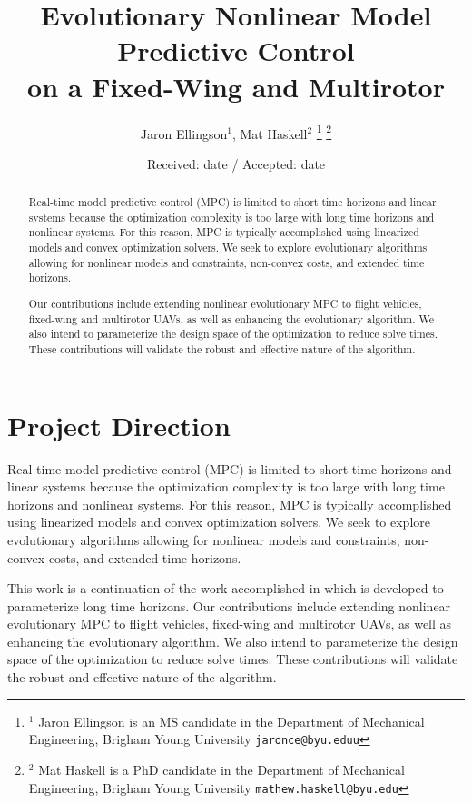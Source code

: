\documentclass[letterpaper, 10 pt, conference]{ieeeconf}  %
\title{\LARGE \bf
	Evolutionary Nonlinear Model Predictive Control \\ on a Fixed-Wing and Multirotor
}
\author{Jaron Ellingson$^{1}$, Mat Haskell$^{2}$%
	\thanks{$^{1}$ Jaron Ellingson is an MS candidate in the Department of Mechanical Engineering, Brigham Young University
		{\tt\small jaronce@byu.eduu}}%
	\thanks{$^{2}$ Mat Haskell is a PhD candidate in the Department of Mechanical Engineering, Brigham Young University
		{\tt\small mathew.haskell@byu.edu}}%
}
\begin{document}
\maketitle
\thispagestyle{empty}
\pagestyle{empty}

\date{Received: date / Accepted: date}


\maketitle

\begin{abstract}
Real-time model predictive control (MPC) is limited to short time horizons and linear systems because the optimization complexity is too large with long time horizons and nonlinear systems. For this reason, MPC is typically accomplished using linearized models and convex optimization solvers. We seek to explore evolutionary algorithms allowing for nonlinear models and constraints, non-convex costs, and extended time horizons.

Our contributions include extending nonlinear evolutionary MPC to flight vehicles, fixed-wing and multirotor UAVs, as well as enhancing the evolutionary algorithm. We also intend to parameterize the design space of the optimization to reduce solve times. These contributions will validate the robust and effective nature of the algorithm.

\end{abstract}

\section{Project Direction}


Real-time model predictive control (MPC) is limited to short time horizons and linear systems because the optimization complexity is too large with long time horizons and nonlinear systems. For this reason, MPC is typically accomplished using linearized models and convex optimization solvers. We seek to explore evolutionary algorithms allowing for nonlinear models and constraints, non-convex costs, and extended time horizons. 

This work is a continuation of the work accomplished in \cite{hyatt2020parameterized} which is developed to parameterize long time horizons. Our contributions include extending nonlinear evolutionary MPC to flight vehicles, fixed-wing and multirotor UAVs, as well as enhancing the evolutionary algorithm. We also intend to parameterize the design space of the optimization to reduce solve times. These contributions will validate the robust and effective nature of the algorithm.
\end{document}
